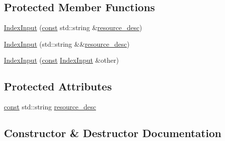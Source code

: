 \subsection*{Protected Member Functions}
\begin{DoxyCompactItemize}
\item 
\mbox{\hyperlink{classlucene_1_1core_1_1store_1_1IndexInput_a34382c26b0c65a1cb25ee3afc4f974f0}{Index\+Input}} (\mbox{\hyperlink{ZlibCrc32_8h_a2c212835823e3c54a8ab6d95c652660e}{const}} std\+::string \&\mbox{\hyperlink{classlucene_1_1core_1_1store_1_1IndexInput_a5425147277f9cf9c08ba50e411c45473}{resource\+\_\+desc}})
\item 
\mbox{\hyperlink{classlucene_1_1core_1_1store_1_1IndexInput_ab44b2af4586b443c23c5f709e57ec218}{Index\+Input}} (std\+::string \&\&\mbox{\hyperlink{classlucene_1_1core_1_1store_1_1IndexInput_a5425147277f9cf9c08ba50e411c45473}{resource\+\_\+desc}})
\item 
\mbox{\hyperlink{classlucene_1_1core_1_1store_1_1IndexInput_a58b86342cc2687096e890f4ed0249abe}{Index\+Input}} (\mbox{\hyperlink{ZlibCrc32_8h_a2c212835823e3c54a8ab6d95c652660e}{const}} \mbox{\hyperlink{classlucene_1_1core_1_1store_1_1IndexInput}{Index\+Input}} \&other)
\end{DoxyCompactItemize}
\subsection*{Protected Attributes}
\begin{DoxyCompactItemize}
\item 
\mbox{\hyperlink{ZlibCrc32_8h_a2c212835823e3c54a8ab6d95c652660e}{const}} std\+::string \mbox{\hyperlink{classlucene_1_1core_1_1store_1_1IndexInput_a5425147277f9cf9c08ba50e411c45473}{resource\+\_\+desc}}
\end{DoxyCompactItemize}


\subsection{Constructor \& Destructor Documentation}
\mbox{\label{classlucene_1_1core_1_1store_1_1IndexInput_a34382c26b0c65a1cb25ee3afc4f974f0}} 
